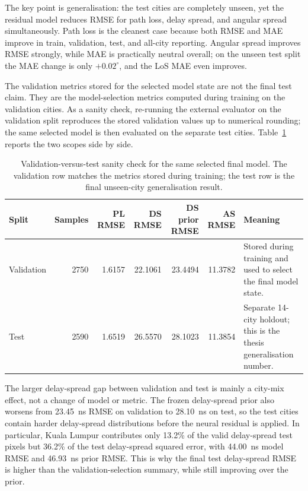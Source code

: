 The key point is generalisation: the test cities are completely unseen, yet
the residual model reduces RMSE for path loss, delay spread, and angular spread
simultaneously. Path loss is the cleanest case because both RMSE and MAE improve
in train, validation, test, and all-city reporting. Angular spread improves
RMSE strongly, while MAE is practically neutral overall; on the unseen test
split the MAE change is only \(+0.02^\circ\), and the LoS MAE even improves.

The validation metrics stored for the selected model state are not the final
test claim. They are the model-selection metrics computed during training on
the validation cities. As a sanity check, re-running the external evaluator on
the validation split reproduces the stored validation values up to numerical
rounding; the same selected model is then evaluated on the separate test
cities.
Table~\ref{tab:try80_val_test_sanity} reports the two scopes side by side.

\begin{table}[H]
\centering
\caption[Validation-versus-test sanity check.]%
{Validation-versus-test sanity check for the same selected final model. The
validation row matches the metrics stored during training; the test row is the
final unseen-city generalisation result.}
\label{tab:try80_val_test_sanity}
\scriptsize
\begin{tabularx}{\textwidth}{lrrrrr>{\raggedright\arraybackslash}X}
\toprule
Split & Samples & PL RMSE & DS RMSE & DS prior RMSE & AS RMSE & Meaning \\
\midrule
Validation & 2750 & 1.6157 & 22.1061 & 23.4494 & 11.3782 & Stored during training and used to select the final model state. \\
Test & 2590 & 1.6519 & 26.5570 & 28.1023 & 11.3854 & Separate 14-city holdout; this is the thesis generalisation number. \\
\bottomrule
\end{tabularx}
\end{table}

The larger delay-spread gap between validation and test is mainly a city-mix
effect, not a change of model or metric. The frozen delay-spread prior
also worsens from \SI{23.45}{ns} RMSE on validation to \SI{28.10}{ns} on test,
so the test cities contain harder delay-spread distributions before the neural
residual is applied. In particular, Kuala Lumpur contributes only 13.2\% of
the valid delay-spread test pixels but 36.2\% of the test delay-spread squared
error, with \SI{44.00}{ns} model RMSE and \SI{46.93}{ns} prior RMSE. This is
why the final test delay-spread RMSE is higher than the validation-selection
summary, while still improving over the prior.


